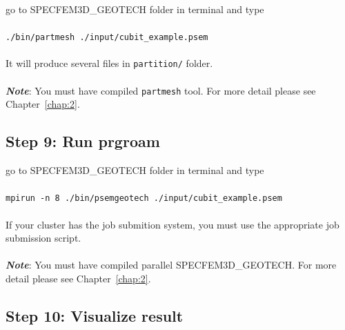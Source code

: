 go to SPECFEM3D\_GEOTECH folder in terminal and type\\
\\
\texttt{./bin/partmesh ./input/cubit\_example.psem}\\
\\
It will produce several files in \texttt{partition/} folder.\\
\\
\textbf{\emph{Note}}: You must have compiled \texttt{partmesh} tool. For more detail please see Chapter~\ref{chap:2}.

\subsection*{Step 9: Run prgroam}

go to SPECFEM3D\_GEOTECH folder in terminal and type\\
\\
\texttt{mpirun -n 8 ./bin/psemgeotech ./input/cubit\_example.psem}\\
\\
If your cluster has the job submition system, you must use the appropriate job submission script.\\
\\

\textbf{\emph{Note}}: You must have compiled parallel SPECFEM3D\_GEOTECH. For more detail please see Chapter~\ref{chap:2}.

\subsection*{Step 10: Visualize result}


